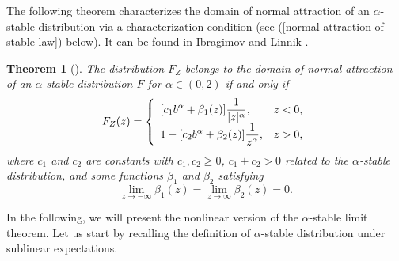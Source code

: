 \documentclass[a4paper,oneside,10pt]{article}%
\newtheorem{theorem}{Theorem}[section]
\numberwithin{equation}{section}
\begin{document}
The following theorem characterizes the domain of normal attraction of an
$\alpha$-stable distribution via a characterization condition (see
(\ref{normal attraction of stable law}) below). It can be found in Ibragimov
and Linnik \cite[Theorem 2.6.7]{IL1971}.

\begin{theorem}
[\cite{IL1971}]\label{classical_condition} The distribution $F_{Z}$ belongs to
the domain of normal attraction of an $\alpha$-stable distribution $F$ for
$\alpha \in(0,2)$ if and only if
\begin{equation}
F_{Z}(z)=\left \{
\begin{array}
[c]{ll}%
\displaystyle[c_{1}b^{\alpha}+\beta_{1}(z)]\frac{1}{|z|^{\alpha}}, & z<0,\\
\displaystyle1-[c_{2}b^{\alpha}+\beta_{2}(z)]\frac{1}{z^{\alpha}}, & z>0,
\end{array}
\right.  \label{normal attraction of stable law}%
\end{equation}
where $c_{1}$ and $c_{2}$ are constants with $c_{1},c_{2}\geq0$, $c_{1}%
+c_{2}>0$ related to the $\alpha$-stable distribution, and some functions
$\beta_{1}$ and $\beta_{2}$ satisfying
\[
\lim_{z\rightarrow-\infty}\beta_{1}(z)=\lim_{z\rightarrow \infty}\beta
_{2}(z)=0.
\]

\end{theorem}





In the following, we will present the nonlinear version of the $\alpha$-stable
limit theorem. Let us start by recalling the definition of $\alpha$-stable
distribution under sublinear expectations.
\end{document}
